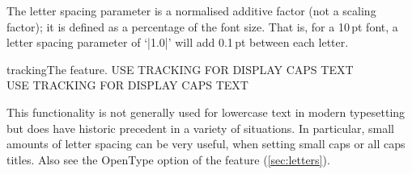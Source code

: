 The letter spacing parameter is a normalised additive factor (not a scaling factor); it is defined as a percentage of the font size. That is, for a 10\,pt font, a letter spacing parameter of `|1.0|' will add 0.1\,pt between each letter.

\begin{Xexample}{tracking}{The  feature.}
  USE TRACKING FOR DISPLAY CAPS TEXT \\
  USE TRACKING FOR DISPLAY CAPS TEXT
\end{Xexample}

This functionality is not generally used for lowercase text in modern typesetting but does have historic precedent in a variety of situations.
In particular, small amounts of letter spacing can be very useful, when setting small caps or all caps titles.
Also see the OpenType  option of the  feature (\vref*{sec:letters}).


%
%
